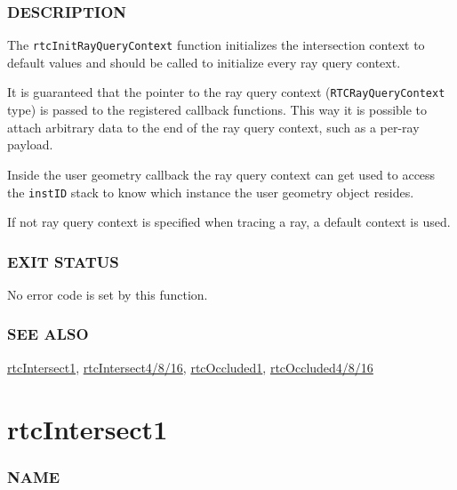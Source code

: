 \subsubsection{DESCRIPTION}\label{description}

The \texttt{rtcInitRayQueryContext} function initializes the
intersection context to default values and should be called to
initialize every ray query context.

It is guaranteed that the pointer to the ray query context
(\texttt{RTCRayQueryContext} type) is passed to the registered callback
functions. This way it is possible to attach arbitrary data to the end
of the ray query context, such as a per-ray payload.

Inside the user geometry callback the ray query context can get used to
access the \texttt{instID} stack to know which instance the user
geometry object resides.

If not ray query context is specified when tracing a ray, a default
context is used.

\subsubsection{EXIT STATUS}\label{exit-status}

No error code is set by this function.

\subsubsection{SEE ALSO}\label{see-also}

\hyperref[rtcintersect1]{rtcIntersect1},
\hyperref[rtcintersect4816]{rtcIntersect4/8/16},
\hyperref[rtcoccluded1]{rtcOccluded1},
\hyperref[rtcoccluded4816]{rtcOccluded4/8/16}

\pagebreak

\section{rtcIntersect1}\label{rtcintersect1}

\subsubsection{NAME}\label{name}

\begin{Shaded}
\begin{Highlighting}[]
\OperatorTok{{-}}
\end{Highlighting}
\end{Shaded}

